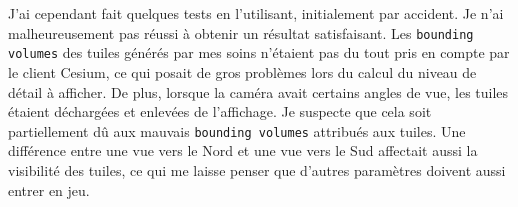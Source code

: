 J'ai cependant fait quelques tests en l'utilisant, initialement par accident. Je n'ai malheureusement pas réussi à obtenir un résultat satisfaisant. Les \texttt{bounding volumes} des tuiles générés par mes soins n'étaient pas du tout pris en compte par le client Cesium, ce qui posait de gros problèmes lors du calcul du niveau de détail à afficher. De plus, lorsque la caméra avait certains angles de vue, les tuiles étaient déchargées et enlevées de l'affichage. Je suspecte que cela soit partiellement dû aux mauvais \texttt{bounding volumes} attribués aux tuiles. Une différence entre une vue vers le Nord et une vue vers le Sud affectait aussi la visibilité des tuiles, ce qui me laisse penser que d'autres paramètres doivent aussi entrer en jeu.